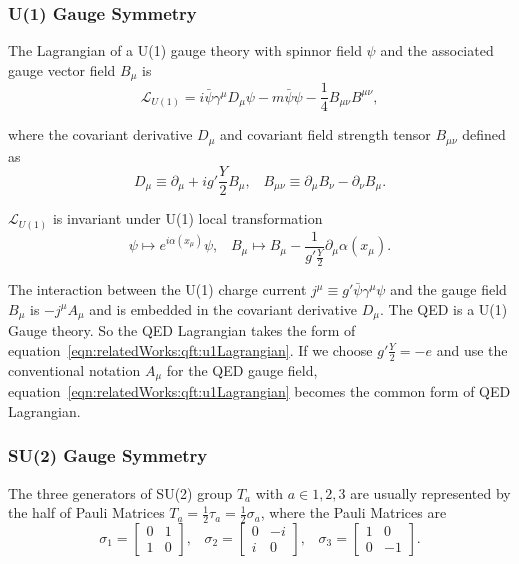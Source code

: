\subsubsection{U(1) Gauge Symmetry}
The Lagrangian of a U(1) gauge theory with spinnor field $\psi$ and the associated gauge vector field $B_\mu$ is
% 
\begin{equation}
    \mathcal{L}_{U(1)} = i\bar{\psi}\gamma^\mu D_\mu \psi  - m\bar{\psi} \psi  - \frac{1}{4}B_{\mu\nu}B^{\mu\nu},
    \label{eqn:relatedWorks:qft:u1Lagrangian}
\end{equation}

\noindent where the covariant derivative $D_\mu$ and covariant field strength tensor $B_{\mu\nu}$ defined as
% 
\begin{equation}
    D_\mu \equiv \partial_\mu +i g' \frac{Y}{2} B_\mu , \;\;\; 
    B_{\mu\nu} \equiv  \partial_\mu B_\nu - \partial_\nu B_\mu.
\end{equation}

\noindent $\mathcal{L}_{U(1)}$ is invariant under U(1) local transformation
% 
\begin{equation}
	\psi \longmapsto e^{i\alpha(x_\mu)} \psi ,\;\;\; 
	B_\mu  \longmapsto  B_\mu - \frac{1}{g'\frac{Y}{2}}\partial_\mu \alpha(x_\mu).
\end{equation}

\noindent The interaction between the U(1) charge current $j^\mu \equiv g' \bar{\psi}\gamma^\mu \psi$ and the gauge field $B_\mu$ is $-j^\mu A_\mu$ and is embedded in the covariant derivative $D_\mu$. The QED is a U(1) Gauge theory. So the QED Lagrangian takes the form of equation~\ref{eqn:relatedWorks:qft:u1Lagrangian}. If we choose $g'\frac{Y}{2} = -e$ and use the conventional notation $A_\mu$ for the QED gauge field, equation~\ref{eqn:relatedWorks:qft:u1Lagrangian} becomes the common form of QED Lagrangian.


\subsubsection{SU(2) Gauge Symmetry}

The three generators of SU(2) group $T_a$ with $a \in {1,2,3 }$ are usually represented by the half of Pauli Matrices $T_a = \frac{1}{2} \tau_a = \frac{1}{2} \sigma_a$, where the Pauli Matrices are 
%
\begin{equation}
    \sigma_1 = \begin{bmatrix} 0 & 1 \\ 1 & 0\end{bmatrix}, \;\;\; 
    \sigma_2 = \begin{bmatrix} 0 & -i \\ i & 0\end{bmatrix}, \;\;\; 
    \sigma_3 = \begin{bmatrix} 1 & 0 \\ 0 & -1\end{bmatrix}.
\end{equation}

